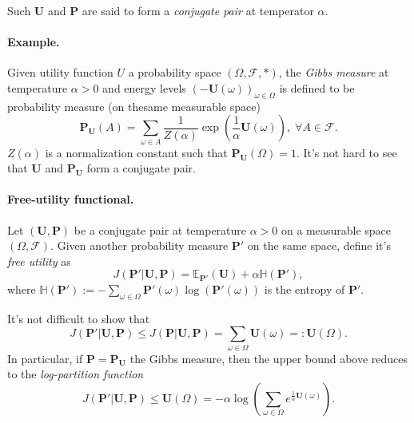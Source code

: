 \documentclass{article} %
\def\U{\mathbf{U}}
\def\P{\mathbf{P}}
\begin{document}
Such $\U$ and $\P$ are said to form a \textit{conjugate pair} at temperator $\alpha$.


\paragraph{Example.}
Given utility function $U$ a probability space $(\Omega, \mathcal F, *)$, the \textit{Gibbs measure} at temperature $\alpha > 0$ and energy levels $(-\U(\omega))_{\omega \in \Omega}$ is defined to be probability measure (on thesame measurable space)
  \begin{equation}
    \P_{\U}(A) = \sum_{\omega \in A}\frac{1}{Z(\alpha)}\exp\left(\frac{1}{\alpha}\U(\omega)\right), \; \forall A \in \mathcal F.
  \end{equation}
$Z(\alpha)$ is a normalization constant such that $\P_{\U}(\Omega) = 1$.  It's not hard to see that $\U$ and $\P_{\U}$  form a conjugate pair.

  \paragraph{Free-utility functional.}
    Let $(\U, \P)$ be a conjugate pair at temperature $\alpha > 0$  on a measurable space $(\Omega, \mathcal F)$. Given another probability measure $\P'$ on the same space, define it's \textit{free utility} as
    \begin{equation}
      J(\P'|\U, \P) = \mathbb E_{\P'}(\U) + \alpha \mathbb H(\P'),
    \label{eq:free_u}
    \end{equation}
    where $\mathbb H(\P') := -\sum_{\omega \in \Omega}\P'(\omega)\log(\P'(\omega))$ is the entropy of $\P'$.

  It's not difficult to show that
  \begin{equation}
    J(\P'|\U,\P) \le J(\P|\U,\P) = \sum_{\omega \in \Omega}\U(\omega) =: \U(\Omega).
  \end{equation}
  In particular, if $\P = \P_{\U}$ the Gibbs measure, then the upper bound above reduces to the \textit{log-partition function}
  \begin{equation}
    J(\P'|\U,\P) \le \U(\Omega) = -\alpha \log\left(\sum_{\omega \in \Omega}e^{\frac{1}{\alpha}\U(\omega)}\right).
    \end{equation}
\end{document}
